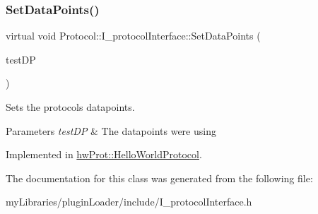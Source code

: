 \subsubsection{\texorpdfstring{SetDataPoints()}{SetDataPoints()}}
{\footnotesize\ttfamily virtual void Protocol\+::\+I\+\_\+protocol\+Interface\+::\+Set\+Data\+Points (\begin{DoxyParamCaption}\item[{\mbox{\hyperlink{structtestAnalyser2_1_1dataPoint}{test\+Analyser2\+::data\+Point}}}]{test\+DP }\end{DoxyParamCaption})\hspace{0.3cm}{\ttfamily [pure virtual]}}



Sets the protocols datapoints. 


\begin{DoxyParams}{Parameters}
{\em test\+DP} & The datapoints we\textquotesingle{}re using \\
\hline
\end{DoxyParams}


Implemented in \mbox{\hyperlink{classhwProt_1_1HelloWorldProtocol_a5946ebe778fcb8dd0136779503a61f82}{hw\+Prot\+::\+Hello\+World\+Protocol}}.



The documentation for this class was generated from the following file\+:\begin{DoxyCompactItemize}
\item 
my\+Libraries/plugin\+Loader/include/I\+\_\+protocol\+Interface.\+h\end{DoxyCompactItemize}
